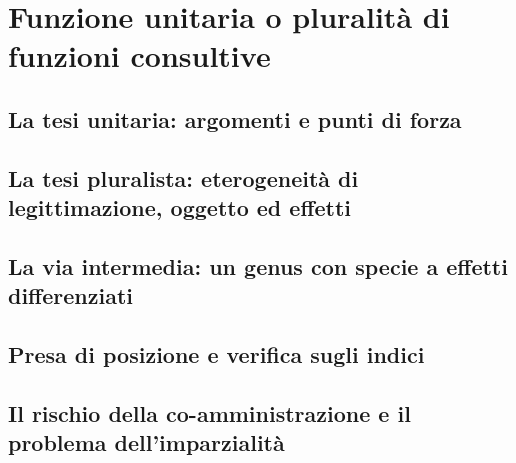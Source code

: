 

\chapter{Funzione unitaria o pluralità di funzioni consultive}
\label{cap:cap6}

\section{La tesi unitaria: argomenti e punti di forza}
\label{sez:cap6:unitaria}


\section{La tesi pluralista: eterogeneità di legittimazione, oggetto ed effetti}
\label{sez:cap6:pluralista}


\section{La via intermedia: un genus con specie a effetti differenziati}
\label{sez:cap6:intermedia}


\section{Presa di posizione e verifica sugli indici}
\label{sez:cap6:posizione}


\section{Il rischio della co-amministrazione e il problema dell'imparzialità}
\label{sez:cap6:coamministrazione}


